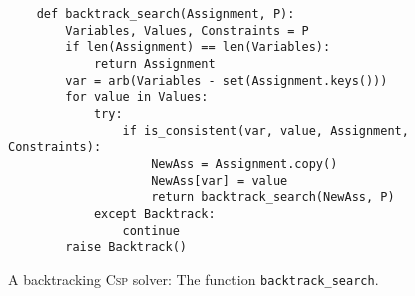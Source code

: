 \begin{figure}[!ht]
\centering
\begin{verbatim}
    def backtrack_search(Assignment, P):
        Variables, Values, Constraints = P
        if len(Assignment) == len(Variables):
            return Assignment
        var = arb(Variables - set(Assignment.keys()))
        for value in Values:
            try:
                if is_consistent(var, value, Assignment, Constraints):
                    NewAss = Assignment.copy()
                    NewAss[var] = value
                    return backtrack_search(NewAss, P)
            except Backtrack:
                continue
        raise Backtrack()  
\end{verbatim}
\vspace*{-0.3cm}
\caption{A backtracking \textsc{Csp} solver: The function \texttt{backtrack\_search}.}
\label{fig:Backtrack-Solver.ipynb:backtrack_search}
\end{figure}

